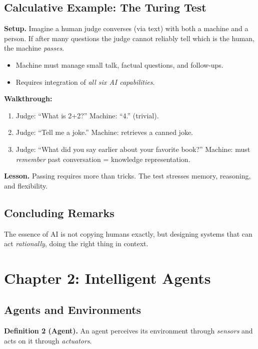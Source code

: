 \documentclass[12pt]{article}
\theoremstyle{definition}
\begin{document}
\subsection*{Calculative Example: The Turing Test}
\textbf{Setup.} Imagine a human judge converses (via text) with both a machine and a person.
If after many questions the judge cannot reliably tell which is the human, the machine
\emph{passes}.

\begin{itemize}[noitemsep]
    \item Machine must manage small talk, factual questions, and follow-ups.
    \item Requires integration of \emph{all six AI capabilities}.
\end{itemize}

\textbf{Walkthrough:}
\begin{enumerate}[noitemsep]
    \item Judge: ``What is 2+2?''  
          Machine: ``4.'' (trivial).
    \item Judge: ``Tell me a joke.''  
          Machine: retrieves a canned joke.  
    \item Judge: ``What did you say earlier about your favorite book?''  
          Machine: must \emph{remember} past conversation = knowledge representation.
\end{enumerate}

\textbf{Lesson.} Passing requires more than tricks. The test stresses memory, reasoning,
and flexibility.

\subsection*{Concluding Remarks}
The essence of AI is not copying humans exactly, but designing systems that can act
\emph{rationally}, doing the right thing in context.

\newpage

\dotfill
\section*{Chapter 2: Intelligent Agents}
\dotfill

\subsection*{Agents and Environments}
\textbf{Definition 2 (Agent).}  
An agent perceives its environment through \emph{sensors} and acts on it through \emph{actuators}.
\end{document}
